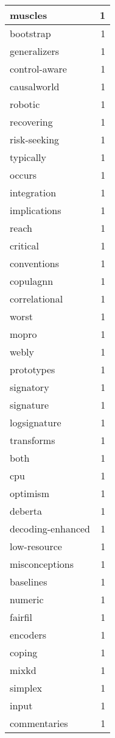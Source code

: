 \begin{table}[h]
\begin{tabular}{|l|r|}
\hline
muscles & 1 \\
\hline
bootstrap & 1 \\
\hline
generalizers & 1 \\
\hline
control-aware & 1 \\
\hline
causalworld & 1 \\
\hline
robotic & 1 \\
\hline
recovering & 1 \\
\hline
risk-seeking & 1 \\
\hline
typically & 1 \\
\hline
occurs & 1 \\
\hline
integration & 1 \\
\hline
implications & 1 \\
\hline
reach & 1 \\
\hline
critical & 1 \\
\hline
conventions & 1 \\
\hline
copulagnn & 1 \\
\hline
correlational & 1 \\
\hline
worst & 1 \\
\hline
mopro & 1 \\
\hline
webly & 1 \\
\hline
prototypes & 1 \\
\hline
signatory & 1 \\
\hline
signature & 1 \\
\hline
logsignature & 1 \\
\hline
transforms & 1 \\
\hline
both & 1 \\
\hline
cpu & 1 \\
\hline
optimism & 1 \\
\hline
deberta & 1 \\
\hline
decoding-enhanced & 1 \\
\hline
low-resource & 1 \\
\hline
misconceptions & 1 \\
\hline
baselines & 1 \\
\hline
numeric & 1 \\
\hline
fairfil & 1 \\
\hline
encoders & 1 \\
\hline
coping & 1 \\
\hline
mixkd & 1 \\
\hline
simplex & 1 \\
\hline
input & 1 \\
\hline
commentaries & 1 \\

\end{tabular}
\end{table}
